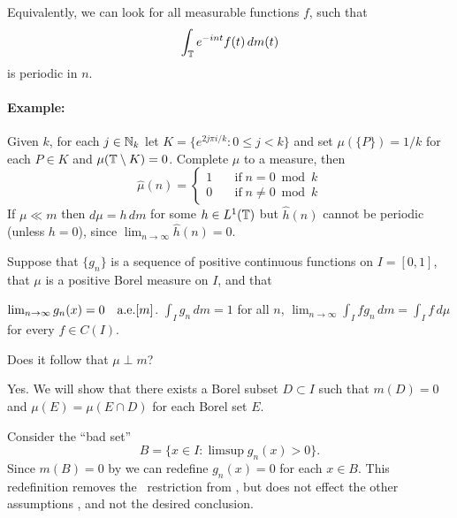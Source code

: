 \begin{enumerate}
Equivalently, we can look for all measurable functions $f$, such that
\begin{equation*}
\int_{\mathbb{T}} e^{-int}f(t)\,dm(t)
\end{equation*}
is periodic in $n$.


\paragraph{Example:} Given $k$, for each \(j\in\mathbb{N}_k\) let
\(K = \{e^{2j\pi i/k}: 0\leq j < k\}\) and set
\(\mu(\{P\}) = 1/k\) for each \(P\in K\)
and \(\mu(\mathbb{T}\setminus K) = 0\). Complete \(\mu\) to a measure,
then
\begin{equation*}
\widehat{\mu}(n) = \left\{
 \begin{array}{ll}
 1 & \quad \textrm{if}\; n = 0 \bmod k \\
 0 & \quad \textrm{if}\; n \neq 0 \bmod k
 \end{array}
 \right.
\end{equation*}
If \(\mu\ll m\) then \(d\mu = h\,dm\) for some \(h\in L^1(\mathbb{T})\)
but \(\widehat{h}(n)\) cannot be periodic (unless \(h=0\)),
since \(\lim_{n\to\infty}\widehat{h}(n) = 0\).


\begin{excopy}
Suppose that \(\{g_n\}\) is a sequence of positive continuous functions on
\(I=[0,1]\), that \(\mu\) is a positive Borel measure  on $I$, and that
\begin{itemize}
 \(\lim_{n\to\infty} g_n(x) = 0\quad \textrm{a.e.} [m]\).
 \(\int_I g_n\,dm = 1\) for all $n$,
 \(\lim_{n\to\infty} \int_I fg_n\,dm = \int_I f\,d\mu\)
              for every \(f\in C(I)\).
\end{itemize}
Does it follow that \(\mu\perp m\)?
\end{excopy}

Yes. We will show that there exists a Borel subset \(D\subset I\) such that
\(m(D)=0\) and \(\mu(E) = \mu(E\cap D)\) for each Borel set $E$.

Consider the ``bad set''
\begin{equation*}
 B = \{x\in I: \limsup g_n(x) > 0\}.
\end{equation*}
Since \(m(B) = 0\) by  we can redefine \(g_n(x)=0\)
for each \(x\in B\).
This redefinition removes the \aded\ restriction from , but
does not effect
the other assumptions ,  and not the desired conclusion.


\end{enumerate}
